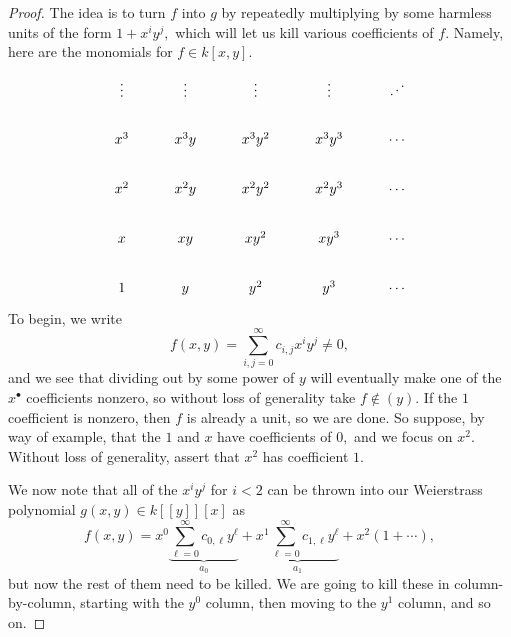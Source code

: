 \begin{proof}
	The idea is to turn $f$ into $g$ by repeatedly multiplying by some harmless units of the form $1+x^iy^j,$ which will let us kill various coefficients of $f.$ Namely, here are the monomials for $f\in k[x,y].$
	\[\begin{tikzcd}
		\vdots & \vdots & \vdots & \vdots & \iddots \\
		{x^3} & {x^3y} & {x^3y^2} & {x^3y^3} & \cdots \\
		{x^2} & {x^2y} & {x^2y^2} & {x^2y^3} & \cdots \\
		x & xy & {xy^2} & {xy^3} & \cdots \\
		1 & y & {y^2} & {y^3} & \cdots
	\end{tikzcd}\]
	To begin, we write
	\[f(x,y)=\sum_{i,j=0}^\infty c_{i,j}x^iy^j\ne0,\]
	and we see that dividing out by some power of $y$ will eventually make one of the $x^\bullet$ coefficients nonzero, so without loss of generality take $f\notin(y).$ If the $1$ coefficient is nonzero, then $f$ is already a unit, so we are done. So suppose, by way of example, that the $1$ and $x$ have coefficients of $0,$ and we focus on $x^2.$ Without loss of generality, assert that $x^2$ has coefficient $1.$
	
	We now note that all of the $x^iy^j$ for $i<2$ can be thrown into our Weierstrass polynomial $g(x,y)\in k[[y]][x]$ as
	\[f(x,y)=x^0\underbrace{\sum_{\ell=0}^\infty c_{0,\ell}y^\ell}_{a_0}+\underbrace{x^1\sum_{\ell=0}^\infty c_{1,\ell}y^\ell}_{a_1}+x^2\left(1+\cdots\right),\]
	but now the rest of them need to be killed. We are going to kill these in column-by-column, starting with the $y^0$ column, then moving to the $y^1$ column, and so on.


\end{proof}

